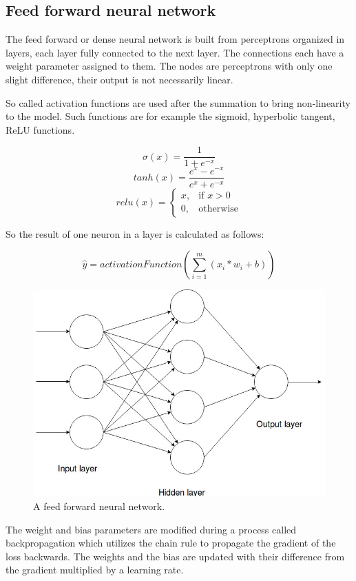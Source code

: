 \FloatBarrier

\subsection{Feed forward neural network}

The feed forward or dense neural network is built from perceptrons organized in layers, each layer fully connected to the next layer. The connections each have a weight parameter assigned to them. The nodes are perceptrons with only one slight difference, their output is not necessarily linear.

So called activation functions are used after the summation to bring non-linearity to the model. Such functions are for example the sigmoid, hyperbolic tangent, ReLU functions.

\[\sigma(x) = \frac{1}{1 + e^{-x}}\]
\[tanh(x) = \frac{e^x - e^{-x}}{e^x + e^{-x}}\]
\[relu(x) = \begin{cases}
	x, & \text{if } x > 0\\
	0, & \text{otherwise}
\end{cases}\]

So the result of one neuron in a layer is calculated as follows:

\[\hat{y} = activationFunction(\sum_{i=1}^{m}(x_i * w_i + b))\]

\begin{figure}[!ht]
	\centering
	\includegraphics[width=125mm, keepaspectratio]{figures/feed_forward_neural_network.jpg}
	\caption{A feed forward neural network.}
	\label{fig:feed_forward}
\end{figure}

The weight and bias parameters are modified during a process called backpropagation which utilizes the chain rule to propagate the gradient of the loss backwards. The weights and the bias are updated with their difference from the gradient multiplied by a learning rate.

